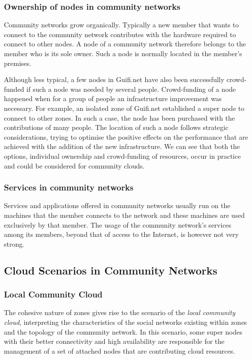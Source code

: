 \subsubsection{Ownership of nodes in community networks}

Community networks grow organically. 
Typically a new member that wants to connect to the community network contributes with the hardware required to connect to other nodes. 
A node of a community network therefore belongs to the member who is its sole owner. 
Such a node is normally located in the member's premises. 

Although less typical, a few nodes in Guifi.net have also been successfully crowd-funded if such a node was needed by several people. 
Crowd-funding of a node happened when for a group of people an infrastructure improvement was necessary. 
For example, an isolated zone of Guifi.net established a super node to connect to other zones. 
In such a case, the node has been purchased with the contributions of many people. 
The location of such a node follows strategic considerations, trying to optimise the positive effects on the performance that are achieved with the addition of the new infrastructure.
We can see that both the options, individual ownership and crowd-funding of resources, occur in practice and could be considered for community clouds.

\subsubsection{Services in community networks} 

Services and applications offered in community networks usually run on the machines that the member connects to the network and these machines are used exclusively by that member. 
The usage of the community network's services among its members, beyond that of access to the Internet, is however not very strong.

\subsection{Cloud Scenarios in Community Networks}

\subsubsection{Local Community Cloud}
\label{sec:loc-cloud}
The cohesive nature of zones gives rise to the scenario of the \emph{local community cloud}, interpreting the characteristics of the social networks existing within zones and the topology of the community network. 
In this scenario, some super nodes with their better connectivity and high availability are responsible for the management of a set of attached nodes that are contributing cloud resources.

